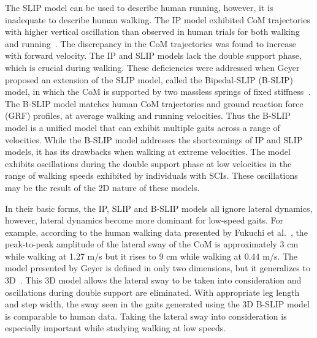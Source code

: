 The SLIP model can be used to describe human running, however, it is inadequate to describe human walking. The IP model exhibited CoM trajectories with higher vertical oscillation than observed in human trials for both walking and running~\cite{lee1998determinants}. The discrepancy in the CoM trajectories was found to increase with forward velocity. The IP and SLIP models lack the double support phase, which is crucial during walking. These deficiencies were addressed when Geyer proposed an extension of the SLIP model, called the Bipedal-SLIP (B-SLIP) model, in which the CoM is supported by two massless springs of fixed stiffness~\cite{geyer2006compliant}. The  B-SLIP model matches human CoM trajectories and ground reaction force (GRF) profiles, at average walking and running velocities. Thus the B-SLIP model is a unified model that can exhibit multiple gaits across a range of velocities. While the B-SLIP model addresses the shortcomings of IP and SLIP models, it has its drawbacks when walking at extreme velocities. The model exhibits oscillations during the double support phase at low velocities in the range of walking speeds exhibited by individuals with SCIs. These oscillations may be the result of the 2D nature of these models.

In their basic forms, the IP, SLIP and B-SLIP models all ignore lateral dynamics, however, lateral dynamics become more dominant for low-speed gaits. For example, according to the human walking data presented by Fukuchi et al.~\cite{fukuchi2018public}, the peak-to-peak amplitude of the lateral sway of the CoM is approximately 3 cm while walking at 1.27 m/s but it rises to 9 cm while walking at 0.44 m/s. The model presented by Geyer is defined in only two dimensions, but it generalizes to 3D~\cite{liu2015dynamic}. This 3D model allows the lateral sway to be taken into consideration and oscillations during double support are eliminated. With appropriate leg length and step width, the sway seen in the gaits generated using the 3D B-SLIP model is comparable to human data. Taking the lateral sway into consideration is especially important while studying walking at low speeds. 

